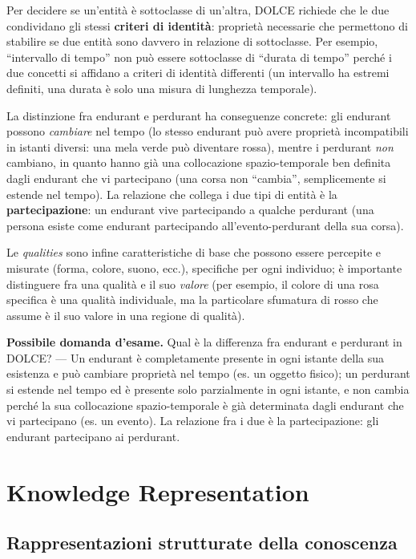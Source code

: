 \documentclass[11pt,a4paper]{report}
\newcommand{\domandaesame}[1]{\begin{esame}\textbf{Possibile domanda d'esame.} #1\end{esame}}
\begin{document}
Per decidere se un'entità è sottoclasse di un'altra, DOLCE richiede che le due condividano gli stessi \textbf{criteri di identità}: proprietà necessarie che permettono di stabilire se due entità sono davvero in relazione di sottoclasse. Per esempio, ``intervallo di tempo'' non può essere sottoclasse di ``durata di tempo'' perché i due concetti si affidano a criteri di identità differenti (un intervallo ha estremi definiti, una durata è solo una misura di lunghezza temporale).

La distinzione fra endurant e perdurant ha conseguenze concrete: gli endurant possono \emph{cambiare} nel tempo (lo stesso endurant può avere proprietà incompatibili in istanti diversi: una mela verde può diventare rossa), mentre i perdurant \emph{non} cambiano, in quanto hanno già una collocazione spazio-temporale ben definita dagli endurant che vi partecipano (una corsa non ``cambia'', semplicemente si estende nel tempo). La relazione che collega i due tipi di entità è la \textbf{partecipazione}: un endurant vive partecipando a qualche perdurant (una persona esiste come endurant partecipando all'evento-perdurant della sua corsa).

Le \emph{qualities} sono infine caratteristiche di base che possono essere percepite e misurate (forma, colore, suono, ecc.), specifiche per ogni individuo; è importante distinguere fra una qualità e il suo \emph{valore} (per esempio, il colore di una rosa specifica è una qualità individuale, ma la particolare sfumatura di rosso che assume è il suo valore in una regione di qualità).

\domandaesame{Qual è la differenza fra endurant e perdurant in DOLCE? --- Un endurant è completamente presente in ogni istante della sua esistenza e può cambiare proprietà nel tempo (es. un oggetto fisico); un perdurant si estende nel tempo ed è presente solo parzialmente in ogni istante, e non cambia perché la sua collocazione spazio-temporale è già determinata dagli endurant che vi partecipano (es. un evento). La relazione fra i due è la partecipazione: gli endurant partecipano ai perdurant.}

\chapter{Knowledge Representation}

\section{Rappresentazioni strutturate della conoscenza}
\end{document}
